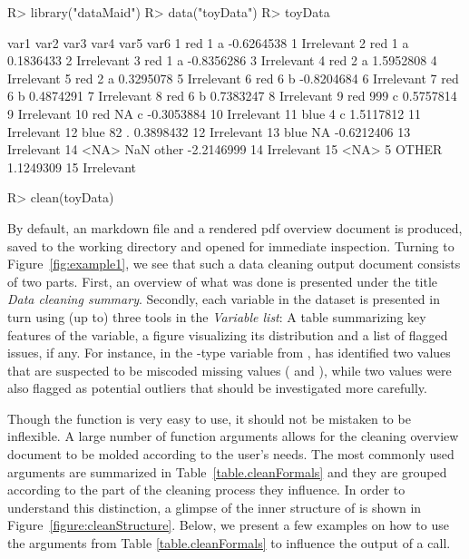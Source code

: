 \documentclass[article,shortnames]{jss}
\newcommand{\hl}[1]{\textcolor{magenta}{#1}}
\begin{document}
\begin{Schunk}
\begin{Sinput}
R> library("dataMaid")
R> data("toyData")
R> toyData
\end{Sinput}
\begin{Soutput}
   var1 var2  var3       var4 var5       var6
1   red    1     a -0.6264538    1 Irrelevant
2   red    1     a  0.1836433    2 Irrelevant
3   red    1     a -0.8356286    3 Irrelevant
4   red    2     a  1.5952808    4 Irrelevant
5   red    2     a  0.3295078    5 Irrelevant
6   red    6     b -0.8204684    6 Irrelevant
7   red    6     b  0.4874291    7 Irrelevant
8   red    6     b  0.7383247    8 Irrelevant
9   red  999     c  0.5757814    9 Irrelevant
10  red   NA     c -0.3053884   10 Irrelevant
11 blue    4     c  1.5117812   11 Irrelevant
12 blue   82     .  0.3898432   12 Irrelevant
13 blue   NA       -0.6212406   13 Irrelevant
14 <NA>  NaN other -2.2146999   14 Irrelevant
15 <NA>    5 OTHER  1.1249309   15 Irrelevant
\end{Soutput}
\end{Schunk}
\begin{Schunk}
\begin{Sinput}
R> clean(toyData)
\end{Sinput}
\end{Schunk}

By default, an  markdown file and a rendered pdf overview
document is produced, saved to the working directory and
opened for immediate inspection. Turning to Figure~\ref{fig:example1},
we see that such a data cleaning output document consists of two
parts. First, an overview of what was done is presented under the
title \textit{Data cleaning summary}. Secondly, each variable in the
dataset is presented in turn using (up to) three tools in the
\textit{Variable list}: A table summarizing key features of the
variable, a figure visualizing its distribution and a
list of flagged issues, if any. For instance, in the -type variable
 from ,  has identified two values that
are suspected to be miscoded missing values ( and ),
while two values were also flagged as potential outliers that should
be investigated more carefully.

Though the  function is very easy to use, it should not be
mistaken to be inflexible. A large number of function arguments allows
for the cleaning overview document to be molded according to the
user's needs. The most commonly used arguments are summarized in
Table~\ref{table.cleanFormals} and they are grouped according to the
part of the cleaning process they influence. In order to understand
this distinction, a glimpse of the inner structure of  is
shown in Figure~\ref{figure:cleanStructure}. Below, we present a few
examples on how to use the arguments from Table \ref{table.cleanFormals}
 to influence the output of a  call.
\end{document}
